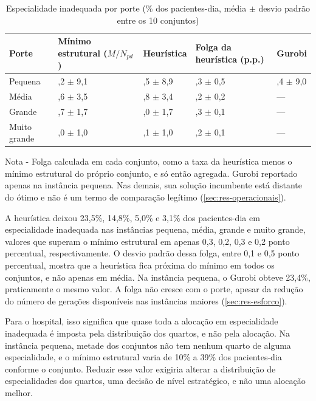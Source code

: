 \begin{table}[H]
    \caption[Especialidade inadequada por porte]{Especialidade inadequada por porte (\% dos pacientes-dia, média $\pm$ desvio padrão entre os 10 conjuntos)}
    \label{tab:res-op-especialidade}
    \centering
    \begin{adjustbox}{max width=\textwidth}
    \begin{tabular}{l*{4}{>{\centering\arraybackslash}p{3.0cm}}}
        \hline
        \textbf{Porte} & \textbf{Mínimo estrutural ($M/N_{pd}$)} & \textbf{Heurística} & \textbf{Folga da heurística (p.p.)} & \textbf{Gurobi} \\
        \hline
        Pequena & 23,2 $\pm$ 9,1 & 23,5 $\pm$ 8,9 & 0,3 $\pm$ 0,5 & 23,4 $\pm$ 9,0 \\
        Média & 14,6 $\pm$ 3,5 & 14,8 $\pm$ 3,4 & 0,2 $\pm$ 0,2 & --- \\
        Grande & 4,7 $\pm$ 1,7 & 5,0 $\pm$ 1,7 & 0,3 $\pm$ 0,1 & --- \\
        Muito grande & 3,0 $\pm$ 1,0 & 3,1 $\pm$ 1,0 & 0,2 $\pm$ 0,1 & --- \\
        \hline
    \end{tabular}
    \end{adjustbox}
    \par\smallskip
    {\footnotesize Nota - Folga calculada em cada conjunto, como a taxa da heurística menos o mínimo estrutural do próprio conjunto, e só então agregada. Gurobi reportado apenas na instância pequena. Nas demais, sua solução incumbente está distante do ótimo e não é um termo de comparação legítimo (\autoref{sec:res-operacionais}).}
\end{table}

A heurística deixou 23,5\%, 14,8\%, 5,0\% e 3,1\% dos pacientes-dia em especialidade inadequada nas instâncias pequena, média, grande e muito grande, valores que superam o mínimo estrutural em apenas 0,3, 0,2, 0,3 e 0,2 ponto percentual, respectivamente. O desvio padrão dessa folga, entre 0,1 e 0,5 ponto percentual, mostra que a heurística fica próxima do mínimo em todos os conjuntos, e não apenas em média. Na instância pequena, o Gurobi obteve 23,4\%, praticamente o mesmo valor. A folga não cresce com o porte, apesar da redução do número de gerações disponíveis nas instâncias maiores (\autoref{sec:res-esforco}).

Para o hospital, isso significa que quase toda a alocação em especialidade inadequada é imposta pela distribuição dos quartos, e não pela alocação. Na instância pequena, metade dos conjuntos não tem nenhum quarto de alguma especialidade, e o mínimo estrutural varia de 10\% a 39\% dos pacientes-dia conforme o conjunto. Reduzir esse valor exigiria alterar a distribuição de especialidades dos quartos, uma decisão de nível estratégico, e não uma alocação melhor.

